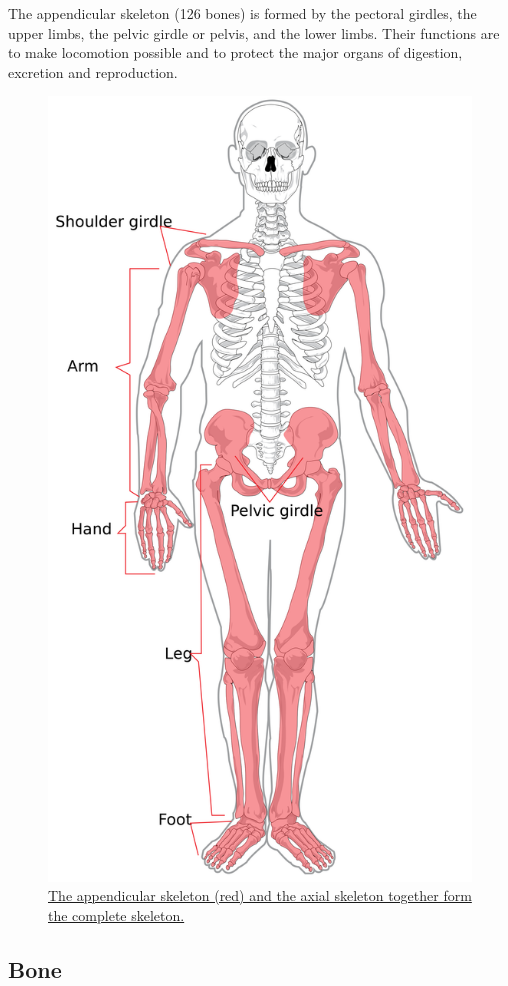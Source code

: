 The appendicular skeleton (126 bones) is formed by the pectoral girdles, the upper limbs, the pelvic girdle or pelvis, and the lower limbs. Their functions are to make locomotion possible and to protect the major organs of digestion, excretion and reproduction.



\begin{figure}

{\centering \includegraphics[width=0.7\linewidth]{./figures/locomotion/Appendicular_skeleton_diagram} 

}

\caption{\href{https://commons.wikimedia.org/wiki/File:Appendicular_skeleton_diagram.svg}{The appendicular skeleton (red) and the axial skeleton together form the complete skeleton.}}\label{fig:appendicularskeleton}
\end{figure}

\hypertarget{bone}{%
\subsection{Bone}\label{bone}}

